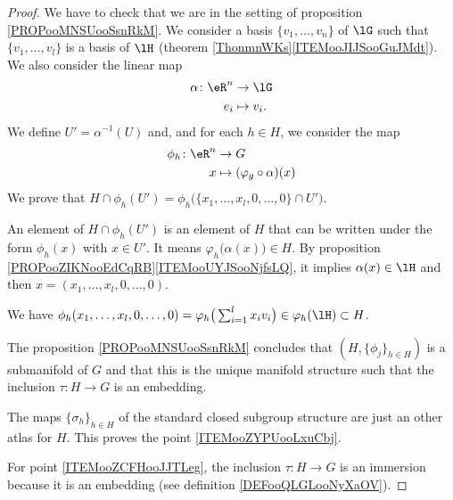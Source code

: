 \begin{proof}
	We have to check that we are in the setting of proposition \ref{PROPooMNSUooSsnRkM}. We consider a basis \( \{ v_1,\ldots,v_n \}\) of \( \lG\) such that \( \{ v_1,\ldots,v_l \}\) is a basis of \( \lH\) (theorem \ref{ThonmnWKs}\ref{ITEMooJIJSooGuJMdt}). We also consider the linear map
	\begin{equation}
		\begin{aligned}
			\alpha\colon \eR^n & \to \lG      \\
			e_i                & \mapsto v_i.
		\end{aligned}
	\end{equation}
	We define \( U'=\alpha^{-1}(U)\) and, and for each \( h\in H\), we consider the map
	\begin{equation}
		\begin{aligned}
			\phi_h\colon \eR^n & \to G                             \\
			x                  & \mapsto (\varphi_g\circ\alpha)(x)
		\end{aligned}
	\end{equation}
	We prove that \( H\cap \phi_h(U')=\phi_h\big( \{ x_1,\ldots,x_l,0,\ldots,0 \}\cap U' \big)\).
	\begin{subproof}
		An element of \( H\cap \phi_h(U')\) is an element of \( H\) that can be written under the form \( \phi_h(x)\) with \( x\in U'\). It means \( \varphi_h\big( \alpha(x) \big)\in H\). By proposition \ref{PROPooZIKNooEdCqRB}\ref{ITEMooUYJSooNjfsLQ}, it implies \( \alpha(x)\in \lH\) and then \( x=(x_1,\ldots,x_l,0,\ldots,0)\).

		We have \( \phi_h(x_1,\ldots,x_l,0,\ldots,0)=\varphi_h\big( \sum_{i=1}^lx_iv_i \big)\in\varphi_h(\lH)\subset H\).
	\end{subproof}
	The proposition \ref{PROPooMNSUooSsnRkM} concludes that \( (H,\{ \phi_j \}_{h\in H})\) is a submanifold of \( G\) and that this is the unique manifold structure such that the inclusion \(\tau \colon H\to G  \) is an embedding.

	The maps \( \{ \sigma_h \}_{h\in H}\) of the standard closed subgroup structure are just an other atlas for \( H\). This proves the point \ref{ITEMooZYPUooLxuCbj}.

	For point \ref{ITEMooZCFHooJJTLeg}, the inclusion \(\tau \colon H\to G  \) is an immersion because it is an embedding (see definition \ref{DEFooQLGLooNyXaOV}).
\end{proof}


